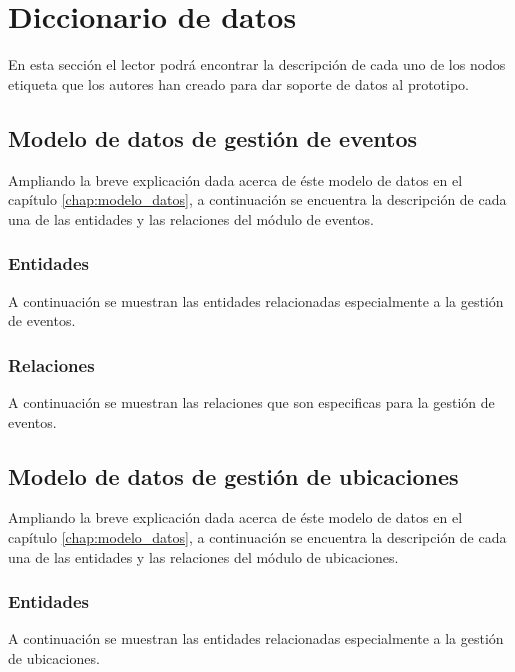 \section{Diccionario de datos}
En esta sección el lector podrá encontrar la descripción de cada uno de los nodos etiqueta que los autores han creado para dar soporte de datos al prototipo.

\subsection{Modelo de datos de gestión de eventos}
Ampliando la breve explicación dada acerca de éste modelo de datos en el capítulo \ref{chap:modelo_datos}, a continuación se encuentra la descripción de cada una de las entidades y las relaciones del módulo de eventos.

\subsubsection{Entidades}
A continuación se muestran las entidades relacionadas especialmente a la gestión de eventos.

\clearpage



\subsubsection{Relaciones}
A continuación se muestran las relaciones que son especificas para la gestión de eventos.

\clearpage




\subsection{Modelo de datos de gestión de ubicaciones}
Ampliando la breve explicación dada acerca de éste modelo de datos en el capítulo \ref{chap:modelo_datos}, a continuación se encuentra la descripción de cada una de las entidades y las relaciones del módulo de ubicaciones.

\subsubsection{Entidades}
A continuación se muestran las entidades relacionadas especialmente a la gestión de ubicaciones.

